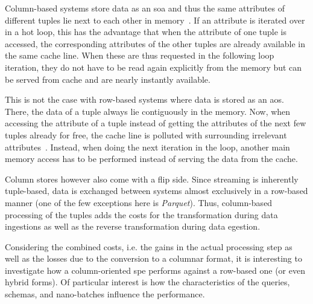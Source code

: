Column-based systems store data as an \ac{soa} and thus the same attributes of different tuples lie next to each other in memory~\cite{DBLP:conf/sigmod/AbadiMH08,DBLP:conf/vldb/AilamakiDHS01}.
If an attribute is iterated over in a hot loop, this has the advantage that when the attribute of one tuple is accessed, the corresponding attributes of the other tuples are already available in the same cache line.
When these are thus requested in the following loop iteration, they do not have to be read again explicitly from the memory but can be served from cache and are nearly instantly available.

This is not the case with row-based systems where data is stored as an \ac{aos}.
There, the data of a tuple always lie contiguously in the memory.
Now, when accessing the attribute of a tuple instead of getting the attributes of the next few tuples already for free, the cache line is polluted with surrounding irrelevant attributes~\cite{DBLP:conf/sigmod/AbadiMH08,DBLP:conf/vldb/AilamakiDHS01}.
Instead, when doing the next iteration in the loop, another main memory access has to be performed instead of serving the data from the cache.

Column stores however also come with a flip side.
Since streaming is inherently tuple-based, data is exchanged between systems almost exclusively in a row-based manner (one of the few exceptions here is \emph{Parquet}).
Thus, column-based processing of the tuples adds the costs for the transformation during data ingestions as well as the reverse transformation during data egestion.

Considering the combined costs, i.e. the gains in the actual processing step as well as the losses due to the conversion to a columnar format, it is interesting to investigate how a column-oriented \ac{spe} performs against a row-based one (or even hybrid forms).
Of particular interest is how the characteristics of the queries, schemas, and nano-batches influence the performance.